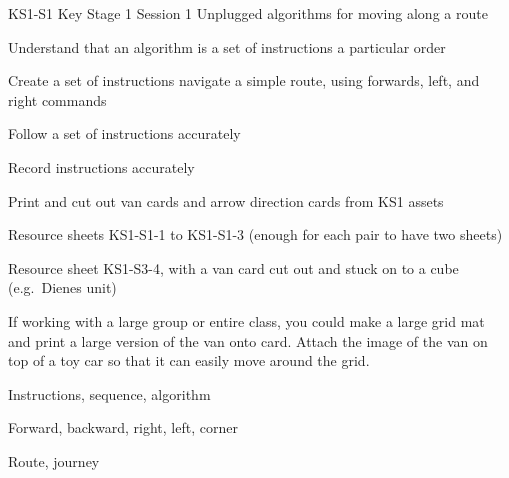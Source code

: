 \documentclass{../../../lessonplan}
\begin{document}
\lessonplantitle
    {KS1-S1}
    {Key Stage 1 Session 1}
    {Unplugged algorithms for moving along a route}

\preamble
    {
    \item Understand that an algorithm is a set of instructions a particular order
    \item Create a set of instructions navigate a simple route, using forwards, left, and right commands
    \item Follow a set of instructions accurately
    \item Record instructions accurately
    }
    {
    \item Print and cut out van cards and arrow direction cards from KS1 assets
    \item Resource sheets KS1-S1-1 to KS1-S1-3 (enough for each pair to have two sheets)
    \item Resource sheet KS1-S3-4, with a van card cut out and stuck on to a cube (e.g.\ Dienes unit)
    \item If working with a large group or entire class, you could make a large grid mat and print a large version of the van onto card.
               Attach the image of the van on top of a toy car so that it can easily move around the grid.
    }
    {
    \item Instructions, sequence, algorithm
    \item Forward, backward, right, left, corner
    \item Route, journey
    }
\end{document}

